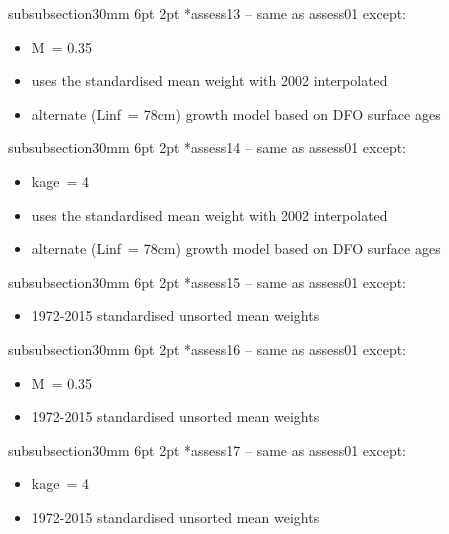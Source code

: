 \documentclass[11pt]{book}
\makeatletter
\renewcommand{\subsubsection}{\@startsection%
{subsubsection}{3}{0mm}%
{6pt \@plus -0pt \@minus -0pt}{2pt \@plus 0pt}%
{\normalfont\bf}}%
\makeatother
\begin{document}
\subsubsection*{assess13 -- same as assess01 except:}
\begin{itemize}[nosep]
  \item M~= 0.35
  \item uses the standardised mean weight with 2002 interpolated
  \item alternate (Linf~= 78cm) growth model based on DFO surface ages
\end{itemize}

\subsubsection*{assess14 -- same as assess01 except:}
\begin{itemize}[nosep]
  \item kage~= 4
  \item uses the standardised mean weight with 2002 interpolated
  \item alternate (Linf~= 78cm) growth model based on DFO surface ages
\end{itemize}

\subsubsection*{assess15 -- same as assess01 except:}
\begin{itemize}[nosep]
  \item 1972-2015 standardised unsorted mean weights
\end{itemize}

\subsubsection*{assess16 -- same as assess01 except:}
\begin{itemize}[nosep]
  \item M~= 0.35
  \item 1972-2015 standardised unsorted mean weights
\end{itemize}

\subsubsection*{assess17 -- same as assess01 except:}
\begin{itemize}[nosep]
  \item kage~= 4
  \item 1972-2015 standardised unsorted mean weights
\end{itemize}
\end{document}

